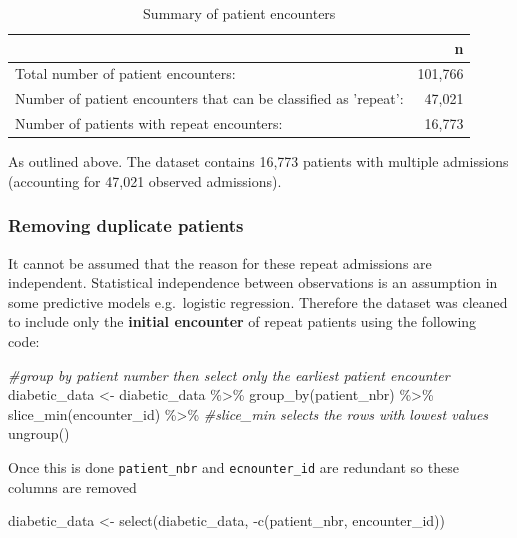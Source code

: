\documentclass[
]{article}
\newenvironment{Shaded}{\begin{snugshade}}{\end{snugshade}}
\newcommand{\CommentTok}[1]{\textcolor[rgb]{0.56,0.35,0.01}{\textit{#1}}}
\newcommand{\FunctionTok}[1]{\textcolor[rgb]{0.00,0.00,0.00}{#1}}
\newcommand{\NormalTok}[1]{#1}
\newcommand{\OtherTok}[1]{\textcolor[rgb]{0.56,0.35,0.01}{#1}}
\newcommand{\SpecialCharTok}[1]{\textcolor[rgb]{0.00,0.00,0.00}{#1}}
\begin{document}
\begin{table}[H]

\caption{\label{tab:unnamed-chunk-4}Summary of patient encounters}
\centering
\begin{tabular}[t]{l|r}
\hline
  & n\\
\hline
Total number of patient encounters: & 101,766\\
\hline
Number of patient encounters that can be classified as 'repeat': & 47,021\\
\hline
Number of patients with repeat encounters: & 16,773\\
\hline
\end{tabular}
\end{table}

As outlined above. The dataset contains 16,773 patients with multiple
admissions (accounting for 47,021 observed admissions).

\hypertarget{removing-duplicate-patients}{%
\subsubsection{Removing duplicate
patients}\label{removing-duplicate-patients}}

It cannot be assumed that the reason for these repeat admissions are
independent. Statistical independence between observations is an
assumption in some predictive models e.g.~logistic regression. Therefore
the dataset was cleaned to include only the \textbf{initial encounter}
of repeat patients using the following code:

\begin{Shaded}
\begin{Highlighting}[]
\CommentTok{\#group by patient number then select only the earliest patient encounter}
\NormalTok{diabetic\_data }\OtherTok{\textless{}{-}}\NormalTok{ diabetic\_data }\SpecialCharTok{\%\textgreater{}\%} 
  \FunctionTok{group\_by}\NormalTok{(patient\_nbr) }\SpecialCharTok{\%\textgreater{}\%}
  \FunctionTok{slice\_min}\NormalTok{(encounter\_id) }\SpecialCharTok{\%\textgreater{}\%} \CommentTok{\#slice\_min selects the rows with lowest values}
  \FunctionTok{ungroup}\NormalTok{()}
\end{Highlighting}
\end{Shaded}

Once this is done \texttt{patient\_nbr} and \texttt{ecnounter\_id} are
redundant so these columns are removed

\begin{Shaded}
\begin{Highlighting}[]
\NormalTok{diabetic\_data }\OtherTok{\textless{}{-}} \FunctionTok{select}\NormalTok{(diabetic\_data, }\SpecialCharTok{{-}}\FunctionTok{c}\NormalTok{(patient\_nbr, encounter\_id))}
\end{Highlighting}
\end{Shaded}
\end{document}

